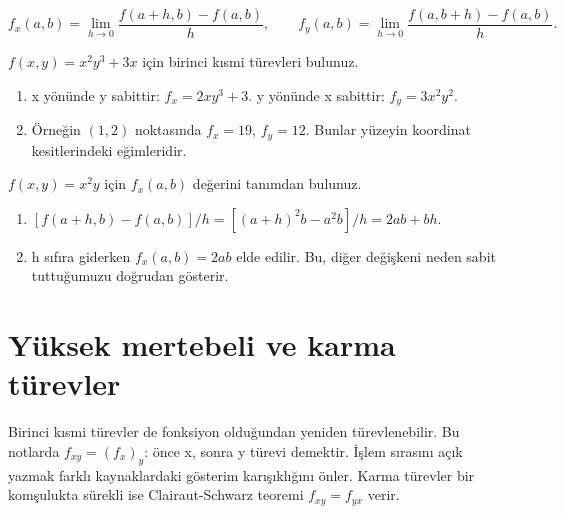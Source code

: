 {\small\[
f_x(a,b)=\lim_{h\to0}\frac{f(a+h,b)-f(a,b)}h,\qquad f_y(a,b)=\lim_{h\to0}\frac{f(a,b+h)-f(a,b)}h.
\]}
\begin{tcolorbox}[title={Örnek 5.1 | Dersteki temel kısmi türev},colframe=accent]\(f(x,y)=x^2y^3+3x\) için birinci kısmi türevleri bulunuz.
\par{}\end{tcolorbox}
\begin{tcolorbox}[title={Adım adım çözüm},colback=green!3!white,colframe=green]\begin{enumerate}
\item x yönünde y sabittir: \(f_x=2xy^3+3\). y yönünde x sabittir: \(f_y=3x^2y^2\).
\item Örneğin \((1,2)\) noktasında \(f_x=19\), \(f_y=12\). Bunlar yüzeyin koordinat kesitlerindeki eğimleridir.
\end{enumerate}\end{tcolorbox}
\begin{tcolorbox}[title={Örnek 5.2 | Limit tanımıyla kısmi türev},colframe=accent]\(f(x,y)=x^2y\) için \(f_x(a,b)\) değerini tanımdan bulunuz.
\par\vspace{1mm}{\scriptsize\sffamily Pekiştirme}\end{tcolorbox}
\begin{tcolorbox}[title={Adım adım çözüm},colback=green!3!white,colframe=green]\begin{enumerate}
\item \([f(a+h,b)-f(a,b)]/h=[(a+h)^2b-a^2b]/h=2ab+bh\).
\item h sıfıra giderken \(f_x(a,b)=2ab\) elde edilir. Bu, diğer değişkeni neden sabit tuttuğumuzu doğrudan gösterir.
\end{enumerate}\end{tcolorbox}
\section{Yüksek mertebeli ve karma türevler}
Birinci kısmi türevler de fonksiyon olduğundan yeniden türevlenebilir. Bu notlarda \(f_{xy}=(f_x)_y\): önce x, sonra y türevi demektir. İşlem sırasını açık yazmak farklı kaynaklardaki gösterim karışıklığını önler. Karma türevler bir komşulukta sürekli ise Clairaut-Schwarz teoremi \(f_{xy}=f_{yx}\) verir.


